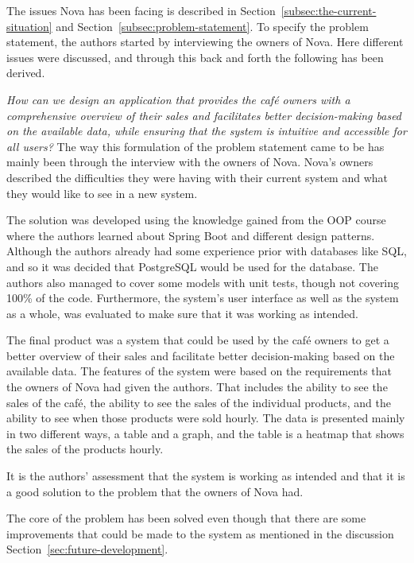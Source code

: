 The issues Nova has been facing is described in Section~\ref{subsec:the-current-situation} and
Section~\ref{subsec:problem-statement}.
To specify the problem statement, the authors started by interviewing the owners of Nova.
Here different issues were discussed, and through this back and forth the following has been derived.

\textit{How can we design an application that provides the café owners with a comprehensive overview of their sales and
facilitates better decision-making based on the available data, while ensuring that the system is intuitive and
accessible for all users?}
The way this formulation of the problem statement came to be has mainly been through the interview with the owners of
Nova.
Nova's owners described the difficulties they were having with their current system and what they would like to see in a
new system.

The solution was developed using the knowledge gained from the OOP course where the authors learned about Spring Boot
and different design patterns.
Although the authors already had some experience prior with databases like SQL,
and so it was decided that PostgreSQL would be used for the database.
The authors also managed to cover some models with unit tests, though not covering 100\% of the code.
Furthermore, the system's user interface as well as the system as a whole, was evaluated to make sure that it
was working as intended.

The final product was a system that could be used by the café owners to get a better overview of their sales and
facilitate better decision-making based on the available data.
The features of the system were based on the requirements that the owners of Nova had given the authors.
That includes the ability to see the sales of the café, the ability to see the sales of the individual products, and the
ability to see when those products were sold hourly.
The data is presented mainly in two different ways, a table and a graph, and the table is a heatmap that shows the sales
of the products hourly.

It is the authors' assessment that the system is working as intended
and that it is a good solution to the problem that the owners of Nova had.

The core of the problem has been solved even though that there are some improvements that could
be made to the system as mentioned in the discussion Section~\ref{sec:future-development}.

